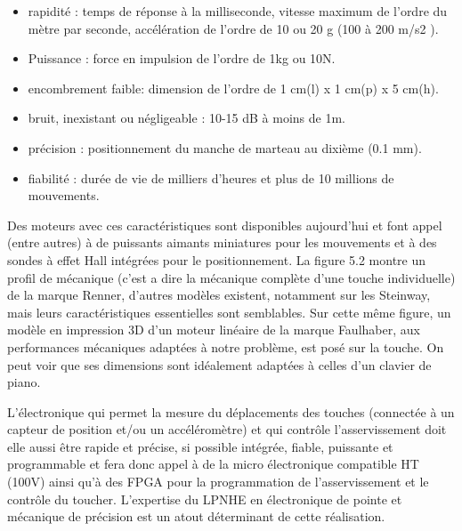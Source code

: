 \documentclass[french,a4paper,12pt]{report}
\begin{document}
\begin{itemize}
\item  rapidité : temps de réponse à la milliseconde, vitesse maximum de l’ordre du mètre par
seconde, accélération de l’ordre de 10 ou 20 g (100 à 200 m/s2 ).

\item Puissance : force en impulsion de l'ordre de 1kg ou 10N.

\item encombrement faible: dimension de l'ordre de 1 cm(l) x 1 cm(p) x 5 cm(h).

\item bruit, inexistant ou négligeable : 10-15 dB à moins de 1m.

\item précision : positionnement du manche de marteau au dixième (0.1 mm).

\item fiabilité : durée de vie de milliers d'heures et plus de 10 millions de mouvements.
\end{itemize}

Des moteurs avec ces caractéristiques sont disponibles aujourd’hui et font appel (entre autres) à de puissants aimants miniatures pour les mouvements et à des sondes à effet Hall intégrées pour le positionnement. La figure 5.2 montre un profil de mécanique (c’est a dire la mécanique complète d’une touche individuelle) de la marque Renner, d’autres modèles existent, notamment sur les Steinway, mais leurs caractéristiques essentielles sont semblables. Sur cette même figure, un modèle en impression 3D d’un moteur linéaire de la marque Faulhaber, aux performances mécaniques adaptées à notre problème, est posé sur la touche. On peut voir que ses dimensions sont idéalement adaptées à celles d’un clavier de piano.

L’électronique qui permet la mesure du déplacements des touches (connectée à un capteur de position et/ou un accéléromètre) et qui contrôle l’asservissement doit elle aussi être rapide et précise, si possible intégrée, fiable, puissante et programmable et fera donc appel à de la micro électronique compatible HT (100V) ainsi qu’à des FPGA pour la programmation de l’asservissement et le contrôle du toucher. L’expertise du LPNHE en électronique de pointe et mécanique de précision est un atout déterminant de cette réalisation.
\end{document}
